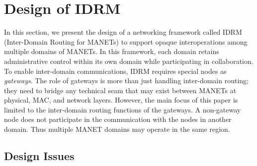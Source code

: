 \section{Design of IDRM}
\label{sec::design}

In this section, we present the design of a networking framework called IDRM ({I}nter-{D}omain {R}outing for {M}ANETs) to support opaque interoperations among multiple domains of MANETs. 
In this framework, each domain retains administrative control within its own domain while participating in collaboration. 
To enable inter-domain communications, IDRM requires special nodes as {\em gateways}.  The role of gateways is more than just handling inter-domain routing; they need to bridge any technical seam that may exist between MANETs at physical, MAC, and network layers. 
However, the main focus of this paper is limited to the inter-domain routing functions of the gateways. A non-gateway node does not participate in the communication with the nodes in another domain. Thus multiple MANET domains may operate in the same region. 


\subsection{Design Issues}

